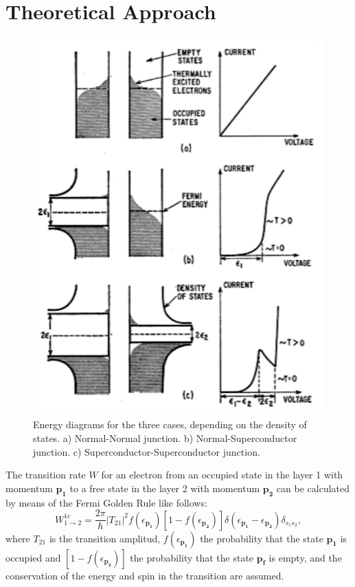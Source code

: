 \documentclass[twocolumn, twoside,a4paper,10pt]{article}
\begin{document}
\section{Theoretical Approach}

\begin{figure}[h!]
\centering
\includegraphics[scale=0.6]{fermi_levels}
\caption{\small Energy diagrams for the three cases, depending on the density of states. a) Normal-Normal junction. b) Normal-Superconductor junction. c) Superconductor-Superconductor junction.   \label{fermi_levels}}
\end{figure}

The transition rate $W$ for an electron from an occupied state in the layer 1 with momentum $\mathbf{p_1}$ to a free state in the layer 2 with momentum $\mathbf{p_2}$ can be calculated by means of the Fermi Golden Rule like follows:
\begin{equation}\label{probability1}
W_{1\to 2}^{1e} = \frac{2\pi}{\hbar} |T_{21}|^2 f(\epsilon_{\mathbf{p_1}}) [1-f(\epsilon_{\mathbf{p_2}})]
		\delta(\epsilon_{\mathbf{p_1}}-\epsilon_{\mathbf{p_2}})\delta_{s_1s_2},
\end{equation}
where $T_{21}$ is the transition amplitud, $ f(\epsilon_{\mathbf{p_1}})$ the probability that the state $\mathbf{p_1}$ is occupied and  $[1-f(\epsilon_{\mathbf{p_2}})]$ the probability that the state $\mathbf{p_f}$ is empty, and the conservation of the energy and spin in the transition are assumed. 
\end{document}
